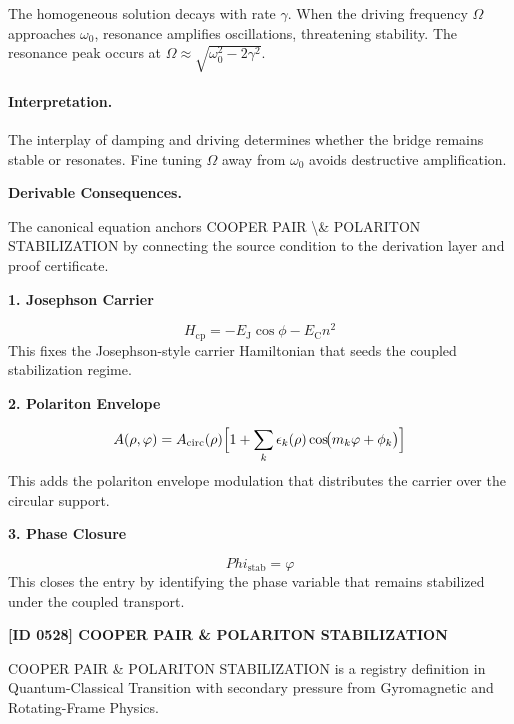 The homogeneous solution decays with rate $\gamma$.  When the driving frequency $\Omega$ approaches $\omega_0$, resonance amplifies oscillations, threatening stability.
The resonance peak occurs at $\Omega \approx \sqrt{\omega_0^2 - 2\gamma^2}$.

\paragraph{Interpretation.}

The interplay of damping and driving determines whether the bridge remains stable or resonates.  Fine tuning $\Omega$ away from $\omega_0$ avoids destructive amplification.

\par\vspace{0.35em}
\noindent\textbf{Derivable Consequences.}\quad
\begingroup
\footnotesize
\raggedright
The canonical equation anchors COOPER PAIR \textbackslash{}\& POLARITON STABILIZATION by connecting the source condition to the derivation layer and proof certificate.
\par\endgroup

\noindent\textbf{1. Josephson Carrier}\par
\[
H_{\mathrm{cp}}=-E_{\mathrm{J}}\cos\phi-E_{\mathrm{C}}n^2
\]
\noindent This fixes the Josephson-style carrier Hamiltonian that seeds the coupled stabilization regime.\par
\noindent\textbf{2. Polariton Envelope}\par
\[
A(\rho,\varphi)=A_{\mathrm{circ}}(\rho)\Bigl[1+\sum_{k}\epsilon_{k}(\rho)\cos\!\bigl(m_{k}\varphi+\phi_{k}\bigr)\Bigr]
\]
\noindent This adds the polariton envelope modulation that distributes the carrier over the circular support.\par
\noindent\textbf{3. Phase Closure}\par
\[
Phi_{\mathrm{stab}}=\varphi
\]
\noindent This closes the entry by identifying the phase variable that remains stabilized under the coupled transport.\par

\clearpage
\noindent\textbf{[ID 0528] COOPER PAIR \& POLARITON STABILIZATION}\par
\vspace{0.35em}
\begingroup\small
{}
COOPER PAIR \& POLARITON STABILIZATION is a registry definition in Quantum-Classical Transition with secondary pressure from Gyromagnetic and Rotating-Frame Physics.

